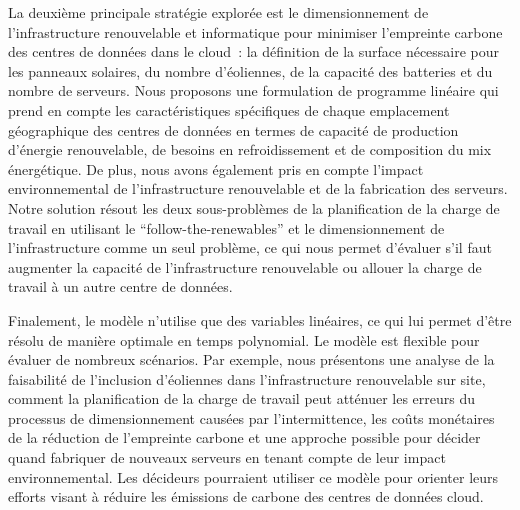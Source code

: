 La deuxième principale stratégie explorée est le dimensionnement de l'infrastructure renouvelable et informatique pour minimiser l'empreinte carbone des centres de données dans le cloud : la définition de la surface nécessaire pour les panneaux solaires, du nombre d'éoliennes, de la capacité des batteries et du nombre de serveurs. Nous proposons une formulation de programme linéaire qui prend en compte les caractéristiques spécifiques de chaque emplacement géographique des centres de données en termes de capacité de production d'énergie renouvelable, de besoins en refroidissement et de composition du mix énergétique. De plus, nous avons également pris en compte l'impact environnemental de l'infrastructure renouvelable et de la fabrication des serveurs. Notre solution résout les deux sous-problèmes de la planification de la charge de travail en utilisant le ``follow-the-renewables'' et le dimensionnement de l'infrastructure comme un seul problème, ce qui nous permet d'évaluer s'il faut augmenter la capacité de l'infrastructure renouvelable ou allouer la charge de travail à un autre centre de données.

Finalement, le modèle n'utilise que des variables linéaires, ce qui lui permet d'être résolu de manière optimale en temps polynomial. Le modèle est flexible pour évaluer de nombreux scénarios. Par exemple, nous présentons une analyse de la faisabilité de l'inclusion d'éoliennes dans l'infrastructure renouvelable sur site, comment la planification de la charge de travail peut atténuer les erreurs du processus de dimensionnement causées par l'intermittence, les coûts monétaires de la réduction de l'empreinte carbone et une approche possible pour décider quand fabriquer de nouveaux serveurs en tenant compte de leur impact environnemental. Les décideurs pourraient utiliser ce modèle pour orienter leurs efforts visant à réduire les émissions de carbone des centres de données cloud. \\
